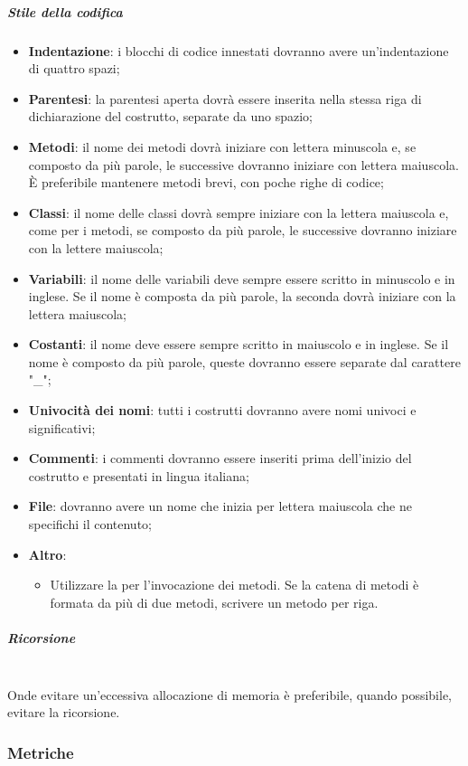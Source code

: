 \subparagraph{Stile della codifica}
\begin{itemize}
\item \textbf{Indentazione}: i blocchi di codice innestati dovranno avere un'indentazione di quattro spazi;
\item \textbf{Parentesi}: la parentesi aperta dovrà essere inserita nella stessa riga di dichiarazione del costrutto, separate da uno spazio; 
\item \textbf{Metodi}: il nome dei metodi dovrà iniziare con lettera minuscola e, se composto da più parole, le successive dovranno iniziare con lettera maiuscola. È preferibile mantenere metodi brevi, con poche righe di codice;
\item \textbf{Classi}: il nome delle classi dovrà sempre iniziare con la lettera maiuscola e, come per i metodi, se composto da più parole, le successive dovranno iniziare con la lettere maiuscola;
\item \textbf{Variabili}: il nome delle variabili deve sempre essere scritto in minuscolo e in inglese. Se il nome è composta da più parole, la seconda dovrà iniziare con la lettera maiuscola;
\item \textbf{Costanti}: il nome deve essere sempre scritto in maiuscolo e in inglese. Se il nome è composto da più parole, queste dovranno essere separate dal carattere "\_";
\item \textbf{Univocità dei nomi}: tutti i costrutti dovranno avere nomi univoci e significativi;
\item \textbf{Commenti}: i commenti dovranno essere inseriti prima dell'inizio del costrutto e presentati in lingua italiana;
\item \textbf{File}: dovranno avere un nome che inizia per lettera maiuscola che ne specifichi il contenuto;
\item \textbf{Altro}:
	\begin{itemize}
		\item Utilizzare la  per l'invocazione dei metodi. Se la catena di metodi è formata da più di due metodi, scrivere un metodo per riga.
	\end{itemize}
\end{itemize}
\subparagraph{Ricorsione} \mbox{} \\
Onde evitare un'eccessiva allocazione di memoria è preferibile, quando possibile, evitare la ricorsione.

\subsubsection{Metriche}
